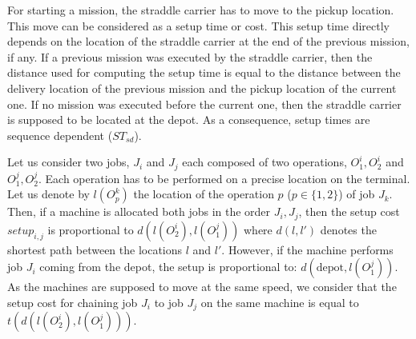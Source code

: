 \documentclass[a4paper,12pt]{article}
\begin{document}

For starting a mission, the straddle carrier has to move to the pickup location. This move can be considered as a setup time or cost. This setup time directly depends on the location of the straddle carrier at the end of the previous mission, if any. If a previous mission was executed by the straddle carrier, then the distance used for computing the setup time is equal to the distance between the delivery location of the previous mission and the pickup location of the current one. If no mission was executed before the current one, then the straddle carrier is supposed to be located at the depot. As a consequence, setup times are sequence dependent ($ST_{sd}$). 

Let us consider two jobs, $J_i$ and $J_j$ each composed of two operations, $O^i_1, O^i_2$ and $O^j_1, O^j_2$. Each operation has to be performed on a precise location on the terminal. Let us denote by $l(O^k_p)$ the location of the operation $p$ ($p \in \{1,2\}$) of job $J_k$. Then, if a machine is allocated both jobs in the order $J_i, J_j$, then the setup cost $setup_{i,j}$ is proportional to $d(l(O^i_2),l(O^j_1))$ where $d(l,l')$ denotes the shortest path between the locations $l$ and $l'$. However, if the machine performs job $J_i$ coming from the depot, the setup is proportional to: $d(\mbox{depot},l(O^j_1))$. As the machines are supposed to move at the same speed, we consider that the setup cost for chaining job $J_i$ to job $J_j$ on the same machine is equal to $t(d(l(O^i_2),l(O^j_1)))$. %
%
 
\end{document}
